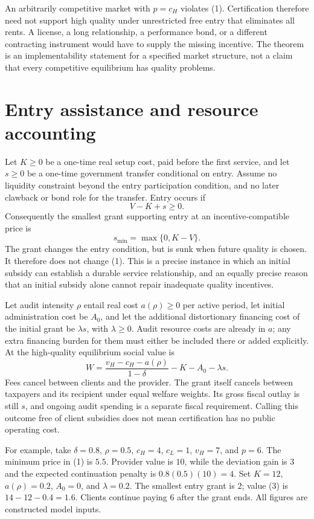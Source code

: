 \documentclass[11pt,a4paper]{article}
\begin{document}
An arbitrarily competitive market with $p=c_H$ violates (1). Certification therefore need not support high quality under unrestricted free entry that eliminates all rents. A license, a long relationship, a performance bond, or a different contracting instrument would have to supply the missing incentive. The theorem is an implementability statement for a specified market structure, not a claim that every competitive equilibrium has quality problems.
\section{Entry assistance and resource accounting}
Let $K\ge0$ be a one-time real setup cost, paid before the first service, and let $s\ge0$ be a one-time government transfer conditional on entry. Assume no liquidity constraint beyond the entry participation condition, and no later clawback or bond role for the transfer. Entry occurs if
\[
 V-K+s\ge0.
\]
Consequently the smallest grant supporting entry at an incentive-compatible price is
\[
 s_{\min}=\max\{0,K-V\}.
 \tag{2}
\]
The grant changes the entry condition, but is sunk when future quality is chosen. It therefore does not change (1). This is a precise instance in which an initial subsidy can establish a durable service relationship, and an equally precise reason that an initial subsidy alone cannot repair inadequate quality incentives.

Let audit intensity $\rho$ entail real cost $a(\rho)\ge0$ per active period, let initial administration cost be $A_0$, and let the additional distortionary financing cost of the initial grant be $\lambda s$, with $\lambda\ge0$. Audit resource costs are already in $a$; any extra financing burden for them must either be included there or added explicitly. At the high-quality equilibrium social value is
\[
 W=\frac{v_H-c_H-a(\rho)}{1-\delta}-K-A_0-\lambda s.
 \tag{3}
\]
Fees cancel between clients and the provider. The grant itself cancels between taxpayers and its recipient under equal welfare weights. Its gross fiscal outlay is still $s$, and ongoing audit spending is a separate fiscal requirement. Calling this outcome free of client subsidies does not mean certification has no public operating cost.

For example, take $\delta=0.8$, $\rho=0.5$, $c_H=4$, $c_L=1$, $v_H=7$, and $p=6$. The minimum price in (1) is $5.5$. Provider value is $10$, while the deviation gain is $3$ and the expected continuation penalty is $0.8(0.5)(10)=4$. Set $K=12$, $a(\rho)=0.2$, $A_0=0$, and $\lambda=0.2$. The smallest entry grant is $2$; value (3) is $14-12-0.4=1.6$. Clients continue paying $6$ after the grant ends. All figures are constructed model inputs.
\end{document}
